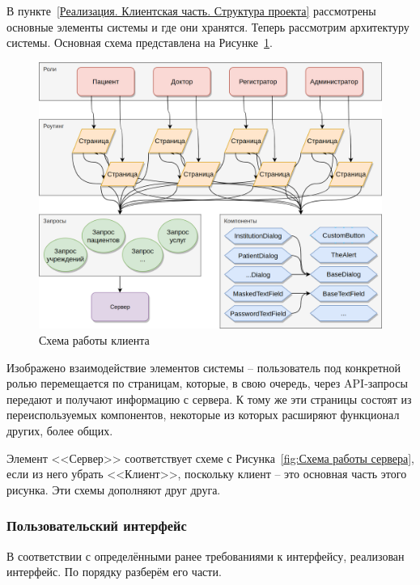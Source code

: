 \documentclass[a4paper,article]{article}
\begin{document}
\begin{sloppypar}
    В пункте~\ref{Реализация. Клиентская часть. Структура проекта} рассмотрены основные элементы системы и где они хранятся. Теперь рассмотрим архитектуру системы. Основная схема представлена на Рисунке~\ref{fig:Схема работы клиента}.

    \begin{figure}[h]
        \centering
        \includegraphics[width=0.9\linewidth]{Схема работы клиента.png}
        \caption{\centering Схема работы клиента}
        \label{fig:Схема работы клиента}
    \end{figure}
    
    \newpage

    Изображено взаимодействие элементов системы -- пользователь под конкретной ролью перемещается по страницам, которые, в свою очередь, через API-запросы передают и получают информацию с сервера. К тому же эти страницы состоят из переиспользуемых компонентов, некоторые из которых расширяют функционал других, более общих.

    Элемент <<Сервер>> соответствует схеме с Рисунка~\ref{fig:Схема работы сервера}, если из него убрать <<Клиент>>, поскольку клиент -- это основная часть этого рисунка. Эти схемы дополняют друг друга.

    \subsubsection{Пользовательский интерфейс}\label{Реализация. Клиентская часть. Пользовательский интерфейс}
    
    В соответствии с определёнными ранее требованиями к интерфейсу, реализован интерфейс. По порядку разберём его части. 
    

\end{sloppypar}
\end{document}
